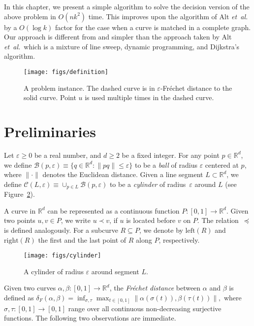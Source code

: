\documentclass[12pt]{dalthesis}
\newcommand{\IR}{\ensuremath{\mathbb{R}}}
\newcommand{\lee}{\leqslant}
\newcommand{\gee}{\geqslant}
\newcommand{\eps}{\varepsilon}
\newcommand{\etal}{{\em et~al.\/}}
\newcommand{\CB}{{\mathscr B}}
\newcommand{\CC}{{\mathscr C}}
\newcommand{\Frechet}{Fr\'echet }
\newcommand{\distF}{\delta_F}
\newcommand{\Left}{\mbox{left}}
\newcommand{\Right}{\mbox{right}}
\newcommand{\lei}{\prec}
\newcommand{\lex}{\preceq}
\begin{document}
In this chapter, we present a simple algorithm to solve the decision version 
of the above problem in $O(nk^2)$ time.
This improves upon the algorithm of Alt \etal~\cite{AltERW03a}
by a $O(\log k)$ factor for the case when a curve is matched in a complete graph.
Our approach is different from and simpler
than the approach taken by Alt \etal\ which is a mixture of line sweep, dynamic
programming, and Dijkstra's algorithm.


\begin{figure}[t]
	\centering
	\texttt{[image: figs/definition]}
	\caption{A problem instance. The dashed curve is in $\eps$-\Frechet distance to the solid curve. Point $u$ is used multiple times in the dashed curve.}
	\label{fig:instance}
\end{figure}




\section{Preliminaries}
\label{sec:preliminariesCPM}

Let $\eps \gee 0$ be a real number, and $d \gee 2$ be a fixed integer.
For any point $p \in \IR^d$,
we define $\CB(p,\eps) \equiv \{q \in \IR^d : \|pq\| \lee \eps\}$
to be a \emph{ball} of radius $\eps$ centered at $p$,
where $\|\cdot\|$ denotes the Euclidean distance.
Given a line segment $L \subset \IR^d$,
we define $\CC(L, \eps) \equiv \cup_{p\in L} \CB(p,\eps)$
to be a \emph{cylinder} of radius~$\eps$ around $L$
(see Figure~\ref{fig:cylinder}).


A curve  in $\IR^d$ can be represented as  a continuous function 
$P:[0,1] \rightarrow \IR^d$.
Given two points $u,v \in P$,  
we write $u \lei v$, if $u$ is located before $v$ on $P$.
The relation~$\lex$ is defined analogously.
For a subcurve $R \subseteq P$,
we denote by $\Left(R)$ and $\Right(R)$
the first and the last point of $R$ along $P$, respectively.


\begin{figure}[h]
	\centering
\texttt{[image: figs/cylinder]}
	\caption{A cylinder of radius $\eps$ around segment $L$.}
	\label{fig:cylinder}
\end{figure}

Given two curves $\alpha, \beta: [0,1] \rightarrow \IR^d$,
the {\em \Frechet distance\/} between $\alpha$ and $\beta$ is defined as
$
	\distF(\alpha,\beta) = \inf_{\sigma, \tau} \max_{t \in [0,1]} \| \alpha(\sigma(t)), \beta(\tau(t)) \|,
$
where $\sigma, \tau: [0,1] \rightarrow [0,1]$ 
range over all continuous non-decreasing surjective functions.
The following two observations are immediate.
\end{document}
